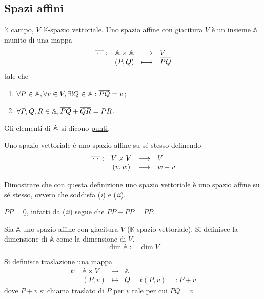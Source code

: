 \documentclass{article}     %
\let\undl\underline
\begin{document}
\subsection{Spazi affini}

\begin{boxdef}
    $\mathbb{K}$ campo, $V ~~ \mathbb{K}$-spazio vettoriale.
    Uno \undl{spazio affine con giacitura $V$} è un insieme $\mathbb{A}$ munito di una mappa
    \[\begin{array}{cccl} \overline{\:\cdot\:\cdot\:} : & \mathbb{A}\times \mathbb{A} & \longrightarrow & V \\ & (P,Q) & \longmapsto & \overline{PQ} \end{array}\]
    tale che 
    \begin{enumerate}[label=$\roman*)$]
        \item $\forall P\in \mathbb{A}, \forall v\in V, \exists!Q\in \mathbb{A} : \overline{PQ}=v$;
        \item $\forall P,Q,R\in \mathbb{A}, \overline{PQ}+\overline{QR}=PR$.
    \end{enumerate}
    Gli elementi di $\mathbb{A}$ si dicono \undl{punti}.
\end{boxdef}

Uno spazio vettoriale è uno spazio affine su sé stesso definendo 
\[\begin{array}{cccl} \overline{\:\cdot\:\cdot\:} : & V\times V & \longrightarrow & V \\ & (v,w) & \longmapsto & w-v \end{array}\]

\begin{exc}\label{exc: sottosp aff-vett}
    Dimostrare che con questa definizione uno spazio vettoriale è uno spazio affine su sé stesso, ovvero che soddisfa (\textit{i}) e (\textit{ii}). 
\end{exc}

\begin{oss}
    $\overline{PP}=\undl{0}$, infatti da (\textit{ii}) segue che $\overline{PP}+\overline{PP}=\overline{PP}$.
\end{oss}

\begin{boxdef}
    Sia $\mathbb{A}$ uno spazio affine con giacitura $V$ ($\mathbb{K}$-spazio vettoriale). Si definisce la dimensione di $\mathbb{A}$ come la dimensione di $V$.
    \[
    \dim \mathbb{A}:=\dim V
    \]
\end{boxdef}

\begin{boxdef}[Traslazione]
    Si definisce traslazione una mappa \[\begin{array}{cccl}t:& \mathbb{A}\times V&\longrightarrow &\mathbb{A}\\
        &(P,v)&\longmapsto&Q=t(P,v)=:P+v\end{array}\]
        dove $P+v$ si chiama traslato di $P$ per $v$ tale per cui $\overline{PQ}=v$
\end{boxdef}
\end{document}
